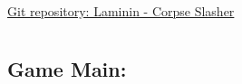\documentclass[letterpaper]{article}
\begin{document}
		\begin{flushleft}
			\LARGE\href{https://github.com/njTaljaard/Laminin_CorpseSlasher/}{Git repository: Laminin - Corpse Slasher}
		\end{flushleft}
		
		\newpage
		
		\section*{\colorbox{blue}{}} 
				\vspace{0.1in}
				
					\subsection*{Game Main:}
					\vspace{0.1in}
						
\end{document}
